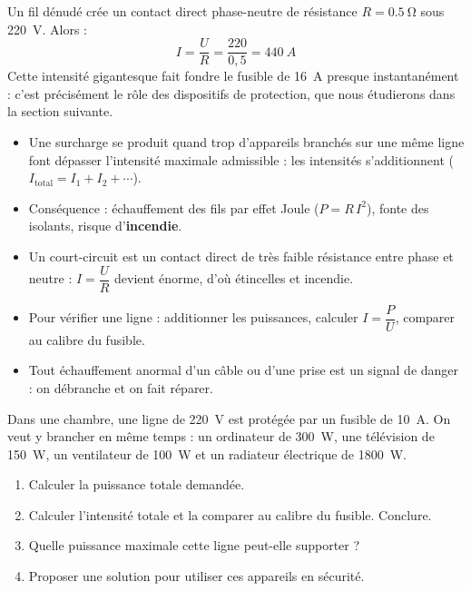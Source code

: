 \documentclass[11pt]{article}
\newcommand{\cle}[1]{{\popxbold\color{popdark}#1}}
\begin{document}
\begin{exemplebox}
Un fil dénudé crée un contact direct phase-neutre de résistance $R = \SI{0,5}{\ohm}$ sous \SI{220}{V}. Alors :
\[ I = \frac{U}{R} = \frac{220}{0,5} = \SI{440}{A} \]
Cette intensité gigantesque fait fondre le fusible de \SI{16}{A} presque instantanément : c'est précisément le rôle des dispositifs de protection, que nous étudierons dans la section suivante.
\end{exemplebox}

\begin{aretenir}
\begin{itemize}
\item Une \cle{surcharge} se produit quand trop d'appareils branchés sur une même ligne font dépasser l'intensité maximale admissible : les intensités s'additionnent ($I_{\text{total}} = I_1 + I_2 + \cdots$).
\item Conséquence : échauffement des fils par \cle{effet Joule} ($P = R\,I^2$), fonte des isolants, risque d'\textbf{incendie}.
\item Un \cle{court-circuit} est un contact direct de très faible résistance entre phase et neutre : $I = \dfrac{U}{R}$ devient énorme, d'où étincelles et incendie.
\item Pour vérifier une ligne : additionner les puissances, calculer $I = \dfrac{P}{U}$, comparer au calibre du fusible.
\item Tout échauffement anormal d'un câble ou d'une prise est un signal de danger : on débranche et on fait réparer.
\end{itemize}
\end{aretenir}

\begin{exercice}
Dans une chambre, une ligne de \SI{220}{V} est protégée par un fusible de \SI{10}{A}. On veut y brancher en même temps : un ordinateur de \SI{300}{W}, une télévision de \SI{150}{W}, un ventilateur de \SI{100}{W} et un radiateur électrique de \SI{1800}{W}.
\begin{enumerate}
\item Calculer la puissance totale demandée.
\item Calculer l'intensité totale et la comparer au calibre du fusible. Conclure.
\item Quelle puissance maximale cette ligne peut-elle supporter ?
\item Proposer une solution pour utiliser ces appareils en sécurité.
\end{enumerate}
\end{exercice}
\end{document}
